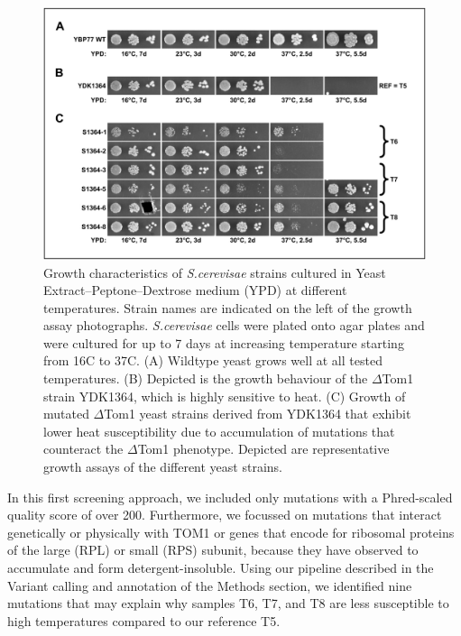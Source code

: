 \documentclass[10pt,a4paper]{article}
\begin{document}
\begin{figure}[h]
	\centering
	\includegraphics[width=0.7\linewidth]{img/yeastgrowth}
	\caption{\small Growth characteristics of \textit{S.cerevisae} strains cultured in Yeast Extract–Peptone–Dextrose medium (YPD) at different temperatures. Strain names are indicated on the left of the growth assay photographs. \textit{S.cerevisae} cells were plated onto agar plates and were cultured for up to 7 days at increasing temperature starting from 16\degree C to 37\degree C. (A) Wildtype yeast grows well at all tested temperatures. (B) Depicted is the growth behaviour of the $\Delta$Tom1 strain YDK1364, which is highly sensitive to heat. (C) Growth of mutated $\Delta$Tom1 yeast strains derived from YDK1364 that exhibit lower heat susceptibility due to accumulation of mutations that counteract the $\Delta$Tom1 phenotype. Depicted are representative growth assays of the different yeast strains.}
	\label{fig:yeastgrowth}
\end{figure}


\noindent In this first screening approach, we included only mutations with a Phred-scaled quality score of over 200. Furthermore, we focussed on mutations that interact genetically or physically with TOM1 or genes that encode for ribosomal proteins of the large (RPL) or small (RPS) subunit, because they have observed to accumulate and form detergent-insoluble. Using our pipeline described in the Variant calling and annotation of the Methods section, we identified nine mutations that may explain why samples T6, T7, and T8 are less susceptible to high temperatures compared to our reference T5.
\end{document}
